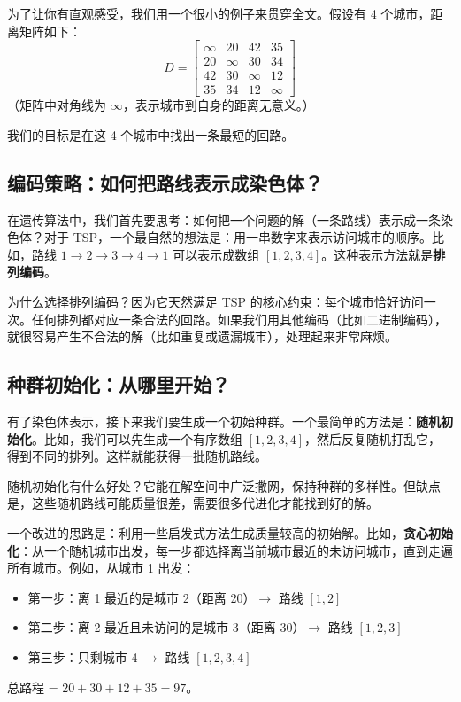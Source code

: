 \documentclass[lang=cn,zihao=-4,a4paper,fontset=windows]{beautybook}
\begin{document}
为了让你有直观感受，我们用一个很小的例子来贯穿全文。假设有 4 个城市，距离矩阵如下：
\[
D = \begin{bmatrix}
\infty & 20 & 42 & 35 \\
20 & \infty & 30 & 34 \\
42 & 30 & \infty & 12 \\
35 & 34 & 12 & \infty
\end{bmatrix}
\]
（矩阵中对角线为 $\infty$，表示城市到自身的距离无意义。）

我们的目标是在这 4 个城市中找出一条最短的回路。

\subsection{编码策略：如何把路线表示成染色体？}

在遗传算法中，我们首先要思考：如何把一个问题的解（一条路线）表示成一条染色体？对于 TSP，一个最自然的想法是：用一串数字来表示访问城市的顺序。比如，路线 $1 \to 2 \to 3 \to 4 \to 1$ 可以表示成数组 $[1, 2, 3, 4]$。这种表示方法就是\textbf{排列编码}。

为什么选择排列编码？因为它天然满足 TSP 的核心约束：每个城市恰好访问一次。任何排列都对应一条合法的回路。如果我们用其他编码（比如二进制编码），就很容易产生不合法的解（比如重复或遗漏城市），处理起来非常麻烦。

\subsection{种群初始化：从哪里开始？}

有了染色体表示，接下来我们要生成一个初始种群。一个最简单的方法是：\textbf{随机初始化}。比如，我们可以先生成一个有序数组 $[1, 2, 3, 4]$，然后反复随机打乱它，得到不同的排列。这样就能获得一批随机路线。

随机初始化有什么好处？它能在解空间中广泛撒网，保持种群的多样性。但缺点是，这些随机路线可能质量很差，需要很多代进化才能找到好的解。

一个改进的思路是：利用一些启发式方法生成质量较高的初始解。比如，\textbf{贪心初始化}：从一个随机城市出发，每一步都选择离当前城市最近的未访问城市，直到走遍所有城市。例如，从城市 1 出发：
\begin{itemize}
    \item 第一步：离 1 最近的是城市 2（距离 20）$\to$ 路线 $[1, 2]$
    \item 第二步：离 2 最近且未访问的是城市 3（距离 30）$\to$ 路线 $[1, 2, 3]$
    \item 第三步：只剩城市 4 $\to$ 路线 $[1, 2, 3, 4]$
\end{itemize}
总路程 = $20 + 30 + 12 + 35 = 97$。
\end{document}
